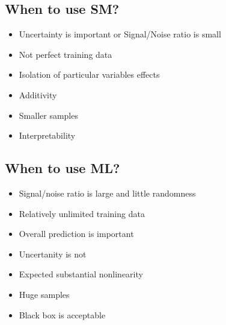 \documentclass[letterpaper,10pt,english]{jupyterBook}
\begin{document}
\subsection{When to use SM?}
\label{\detokenize{Lecture 1:when-to-use-sm}}\begin{itemize}
\item {} 
\sphinxAtStartPar
Uncertainty is important or Signal/Noise ratio is small

\item {} 
\sphinxAtStartPar
Not perfect training data

\item {} 
\sphinxAtStartPar
Isolation of particular variables effects

\item {} 
\sphinxAtStartPar
Additivity

\item {} 
\sphinxAtStartPar
Smaller samples

\item {} 
\sphinxAtStartPar
Interpretability

\end{itemize}


\subsection{When to use ML?}
\label{\detokenize{Lecture 1:when-to-use-ml}}\begin{itemize}
\item {} 
\sphinxAtStartPar
Signal/noise ratio is large and little randomness

\item {} 
\sphinxAtStartPar
Relatively unlimited training data

\item {} 
\sphinxAtStartPar
Overall prediction is important

\item {} 
\sphinxAtStartPar
Uncertanity is not

\item {} 
\sphinxAtStartPar
Expected substantial nonlinearity

\item {} 
\sphinxAtStartPar
Huge samples

\item {} 
\sphinxAtStartPar
Black box is acceptable

\end{itemize}
\end{document}
